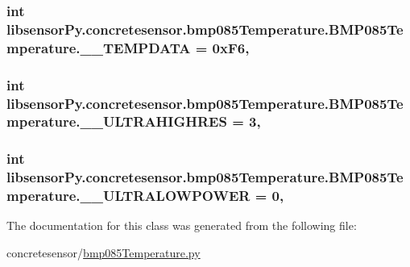 \subsubsection[{\+\_\+\+\_\+\+T\+E\+M\+P\+D\+A\+T\+A}]{\setlength{\rightskip}{0pt plus 5cm}int libsensor\+Py.\+concretesensor.\+bmp085\+Temperature.\+B\+M\+P085\+Temperature.\+\_\+\+\_\+\+T\+E\+M\+P\+D\+A\+T\+A = 0x\+F6\hspace{0.3cm}{\ttfamily [static]}, {\ttfamily [private]}}\label{classlibsensorPy_1_1concretesensor_1_1bmp085Temperature_1_1BMP085Temperature_ae328abbee2f264ae9343017b3af4f71f}
\hypertarget{classlibsensorPy_1_1concretesensor_1_1bmp085Temperature_1_1BMP085Temperature_a1736b06618fd5e8239b1049959bddd76}{}
\subsubsection[{\+\_\+\+\_\+\+U\+L\+T\+R\+A\+H\+I\+G\+H\+R\+E\+S}]{\setlength{\rightskip}{0pt plus 5cm}int libsensor\+Py.\+concretesensor.\+bmp085\+Temperature.\+B\+M\+P085\+Temperature.\+\_\+\+\_\+\+U\+L\+T\+R\+A\+H\+I\+G\+H\+R\+E\+S = 3\hspace{0.3cm}{\ttfamily [static]}, {\ttfamily [private]}}\label{classlibsensorPy_1_1concretesensor_1_1bmp085Temperature_1_1BMP085Temperature_a1736b06618fd5e8239b1049959bddd76}
\hypertarget{classlibsensorPy_1_1concretesensor_1_1bmp085Temperature_1_1BMP085Temperature_adaab8dfe2eafbff825f8e8d0b34bc543}{}
\subsubsection[{\+\_\+\+\_\+\+U\+L\+T\+R\+A\+L\+O\+W\+P\+O\+W\+E\+R}]{\setlength{\rightskip}{0pt plus 5cm}int libsensor\+Py.\+concretesensor.\+bmp085\+Temperature.\+B\+M\+P085\+Temperature.\+\_\+\+\_\+\+U\+L\+T\+R\+A\+L\+O\+W\+P\+O\+W\+E\+R = 0\hspace{0.3cm}{\ttfamily [static]}, {\ttfamily [private]}}\label{classlibsensorPy_1_1concretesensor_1_1bmp085Temperature_1_1BMP085Temperature_adaab8dfe2eafbff825f8e8d0b34bc543}


The documentation for this class was generated from the following file\+:\begin{DoxyCompactItemize}
\item 
concretesensor/\hyperlink{concretesensor_2bmp085Temperature_8py}{bmp085\+Temperature.\+py}\end{DoxyCompactItemize}
